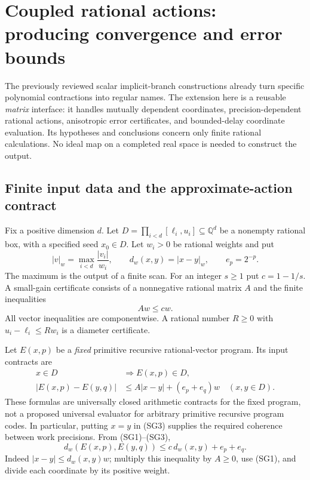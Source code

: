 \section{Coupled rational actions: producing convergence and error bounds}
\label{sec:small-gain}

The previously reviewed scalar implicit-branch constructions already turn
specific polynomial contractions into regular names.  The extension here is
a reusable \emph{matrix} interface: it handles mutually dependent coordinates,
precision-dependent rational actions, anisotropic error certificates, and
bounded-delay coordinate evaluation.  Its hypotheses and conclusions concern
only finite rational calculations.  No ideal map on a completed real space is
needed to construct the output.

\subsection{Finite input data and the approximate-action contract}

Fix a positive dimension $d$.  Let
$D=\prod_{i<d}[\ell_i,u_i]\subseteq\mathbb Q^d$ be a nonempty rational box,
with a specified seed $x_0\in D$.  Let $w_i>0$ be rational weights and put
\[
 |v|_w=\max_{i<d}\frac{|v_i|}{w_i},\qquad
 d_w(x,y)=|x-y|_w,\qquad e_p=2^{-p}.
\]
The maximum is the output of a finite scan.  For an integer $s\ge1$ put
$c=1-1/s$.  A small-gain certificate consists of a nonnegative rational
matrix $A$ and the finite inequalities
\begin{equation}
 Aw\le cw.                                      \tag{SG1}
\end{equation}
All vector inequalities are componentwise.  A rational number $R\ge0$
with $u_i-\ell_i\le Rw_i$ is a diameter certificate.

Let $E(x,p)$ be a \emph{fixed} primitive recursive rational-vector program.
Its input contracts are
\begin{align}
 x\in D&\Longrightarrow E(x,p)\in D,              \tag{SG2}\\
 |E(x,p)-E(y,q)|
 &\le A|x-y|+(e_p+e_q)w\quad(x,y\in D).           \tag{SG3}
\end{align}
These formulas are universally closed arithmetic contracts for the fixed
program, not a proposed universal evaluator for arbitrary primitive
recursive program codes.  In particular, putting $x=y$ in (SG3) supplies
the required coherence between work precisions.  From (SG1)--(SG3),
\begin{equation}
 d_w(E(x,p),E(y,q))\le c\,d_w(x,y)+e_p+e_q.       \tag{SG4}
\end{equation}
Indeed $|x-y|\le d_w(x,y)w$; multiply this inequality by $A\ge0$,
use (SG1), and divide each coordinate by its positive weight.

